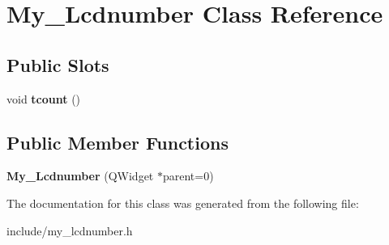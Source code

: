 \hypertarget{class_my___lcdnumber}{\section{My\-\_\-\-Lcdnumber Class Reference}
\label{class_my___lcdnumber}
}
\subsection*{Public Slots}
\begin{DoxyCompactItemize}
\item 
\hypertarget{class_my___lcdnumber_a76015167bb0b4081c430594e6518eac4}{void {\bfseries tcount} ()}\label{class_my___lcdnumber_a76015167bb0b4081c430594e6518eac4}

\end{DoxyCompactItemize}
\subsection*{Public Member Functions}
\begin{DoxyCompactItemize}
\item 
\hypertarget{class_my___lcdnumber_a00689350c637aa54ecd542dcd355681e}{{\bfseries My\-\_\-\-Lcdnumber} (Q\-Widget $\ast$parent=0)}\label{class_my___lcdnumber_a00689350c637aa54ecd542dcd355681e}

\end{DoxyCompactItemize}


The documentation for this class was generated from the following file\-:\begin{DoxyCompactItemize}
\item 
include/my\-\_\-lcdnumber.\-h\end{DoxyCompactItemize}
